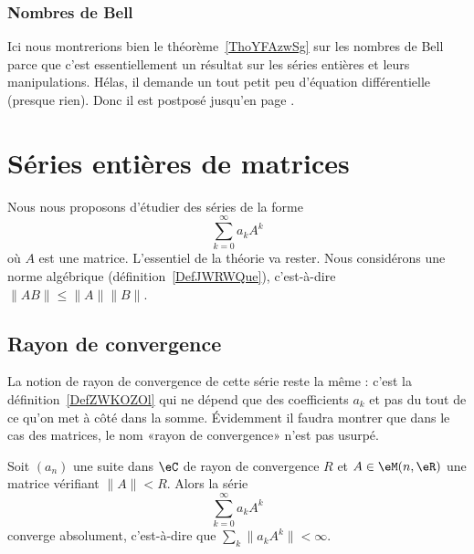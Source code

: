 \subsubsection{Nombres de Bell}

Ici nous montrerions bien le théorème~\ref{ThoYFAzwSg} sur les nombres de Bell parce que c'est essentiellement un résultat sur les séries entières et leurs manipulations. Hélas, il demande un tout petit peu d'équation différentielle (presque rien). Donc il est postposé jusqu'en page \pageref{ThoYFAzwSg}.

\section{Séries entières de matrices}
\label{secEVnZXgf}

Nous nous proposons d'étudier des séries de la forme
\begin{equation}
    \sum_{k=0}^{\infty}a_kA^k
\end{equation}
où \( A\) est une matrice. L'essentiel de la théorie va rester. Nous considérons une norme algébrique (définition~\ref{DefJWRWQue}), c'est-à-dire \( \| AB \|\leq \| A \|\| B \|\).

\subsection{Rayon de convergence}

La notion de rayon de convergence de cette série reste la même : c'est la définition~\ref{DefZWKOZOl} qui ne dépend que des coefficients \( a_k\) et pas du tout de ce qu'on met à côté dans la somme. Évidemment il faudra montrer que dans le cas des matrices, le nom «rayon de convergence» n'est pas usurpé.

\begin{proposition} \label{PropFIPooSSmJDQ}
    Soit \( (a_n)\) une suite dans \( \eC\) de rayon de convergence \( R\) et \( A\in \eM(n,\eR)\) une matrice vérifiant \( \| A \|<R\). Alors la série
    \begin{equation}
        \sum_{k=0}^{\infty}a_kA^k
    \end{equation}
    converge absolument, c'est-à-dire que \( \sum_k\| a_kA^k \|<\infty\).
\end{proposition}

